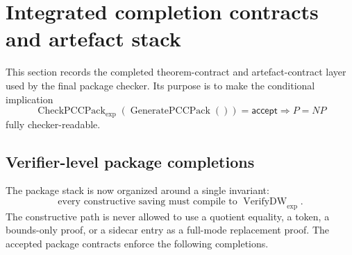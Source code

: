 \documentclass[10.5pt,a4paper]{article}
\newcommand{\VerifyDW}{\operatorname{VerifyDW}_{\exp}}
\newcommand{\CheckPack}{\operatorname{CheckPCCPack}_{\exp}}
\newcommand{\GenPack}{\operatorname{GeneratePCCPack}}
\begin{document}
\section{Integrated completion contracts and artefact stack}

This section records the completed theorem-contract and artefact-contract layer used by the final package checker.  Its purpose is to make the conditional implication
\[
\CheckPack(\GenPack())=\mathsf{accept}\Longrightarrow P=NP
\]
fully checker-readable.

\subsection{Verifier-level package completions}
The package stack is now organized around a single invariant:
\[
\text{every constructive saving must compile to }\VerifyDW.
\]
The constructive path is never allowed to use a quotient equality, a token, a bounds-only proof, or a sidecar entry as a full-mode replacement proof.  The accepted package contracts enforce the following completions.
\end{document}

